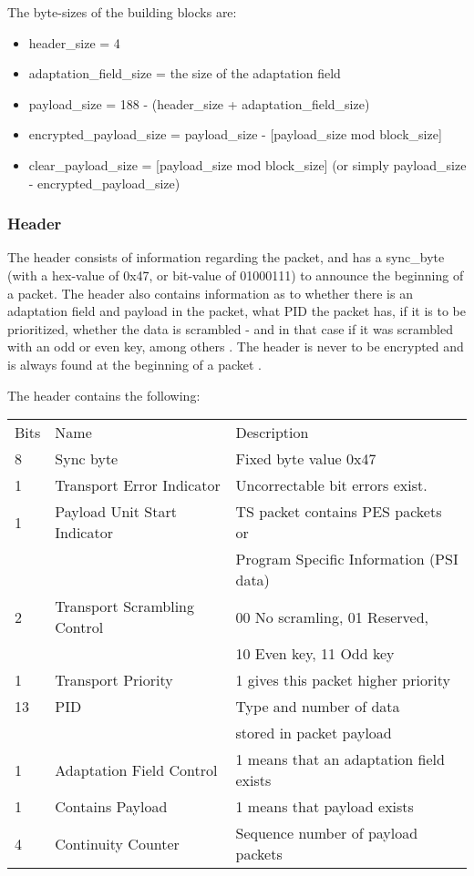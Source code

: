 The byte-sizes of the building blocks are:

\begin{itemize}
\item header\_size = 4
\item adaptation\_field\_size = the size of the adaptation field
\item payload\_size = 188 - (header\_size + adaptation\_field\_size)
\item encrypted\_payload\_size = payload\_size - [payload\_size mod block\_size]
\item clear\_payload\_size = [payload\_size mod block\_size] 
  (or simply payload\_size - encrypted\_payload\_size)
\end{itemize}

\subsubsection{Header}
The header consists of information regarding the packet, 
and has a sync\_byte (with a hex-value of 0x47, or bit-value of 
01000111) to announce the beginning of a packet. The header also 
contains information as to whether there is an adaptation field and 
payload in the packet, what PID the packet has, if it is to be 
prioritized, whether the data is scrambled - and in that case if it 
was scrambled with an odd or even key, among others 
\citep[pp. 25--26]{etsiMPEG:2009}. The header is never to be encrypted 
and is always found at the beginning of a packet 
\citep[pp. 10--11]{DVB:2013}.

The header contains the following:
\begin{longtable}{l l l}
  Bits & Name & Description \\
  8 & Sync byte & Fixed byte value 0x47 \\
  1 & Transport Error Indicator & Uncorrectable bit errors exist. \\
  1 & Payload Unit Start Indicator & TS packet contains PES packets or\\
  & & Program Specific Information (PSI data)\\
  2 & Transport Scrambling Control & 00 No scramling, 01 Reserved, \\
  & & 10 Even key, 11 Odd key \\
  1 & Transport Priority & 1 gives this packet higher priority \\
  13 & PID & Type and number of data \\
  & & stored in packet payload \\
  1 & Adaptation Field Control & 1 means that an adaptation field exists\\
    1 & Contains Payload & 1 means that payload exists \\
    4 & Continuity Counter & Sequence number of payload packets\\
\end{longtable}

